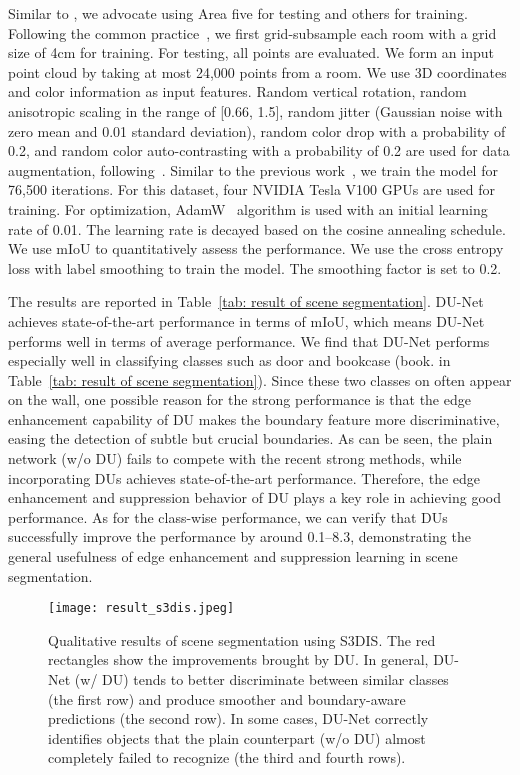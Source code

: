 \documentclass[a4paper,fleqn]{cas-dc}
\begin{document}
Similar to \cite{tchapmi2017segcloud}, we advocate using Area five for testing and others for training. Following the common practice~\cite{thomas2019kpconv,zhao2021point,lan2019modeling}, we first grid-subsample each room with a grid size of 4cm for training. For testing, all points are evaluated. We form an input point cloud by taking at most 24,000 points from a room. We use 3D coordinates and color information as input features. Random vertical rotation, random anisotropic scaling in the range of [0.66, 1.5], random jitter (Gaussian noise with zero mean and 0.01 standard deviation), random color drop with a probability of 0.2, and random color auto-contrasting with a probability of 0.2 are used for data augmentation, following~\cite{zhao2021point,lai2022stratified}. Similar to the previous work~\cite{zhao2021point}, we train the model for 76,500 iterations. For this dataset, four NVIDIA Tesla V100 GPUs are used for training. For optimization, AdamW~\cite{loshchilov2018decoupled} algorithm is used with an initial learning rate of 0.01. The learning rate is decayed based on the cosine annealing schedule. We use mIoU to quantitatively assess the performance.
We use the cross entropy loss with label smoothing to train the model. The smoothing factor is set to 0.2.

The results are reported in Table~\ref{tab: result of scene segmentation}. DU-Net achieves state-of-the-art performance in terms of mIoU, which means DU-Net performs well in terms of average performance.  
We find that DU-Net performs especially well in classifying classes such as door and bookcase (book. in Table~\ref{tab: result of scene segmentation}). Since these two classes on often appear on the wall, one possible reason for the strong performance is that the edge enhancement capability of DU makes the boundary feature more discriminative, easing the detection of subtle but crucial boundaries.  
As can be seen, the plain network (w/o DU) fails to compete with the recent strong methods, while incorporating DUs achieves state-of-the-art performance. Therefore, the edge enhancement and suppression behavior of DU plays a key role in achieving good performance. 
As for the class-wise performance, we can verify that DUs successfully improve the performance by around 0.1--8.3, demonstrating the general usefulness of edge enhancement and suppression learning in scene segmentation.  
\begin{figure*}[t]
     \centering
    \texttt{[image: result\_s3dis.jpeg]}
    \caption{
    Qualitative results of scene segmentation using S3DIS. The red rectangles show the improvements brought by DU. In general, DU-Net (w/ DU) tends to better discriminate between similar classes (the first row) and produce smoother and boundary-aware predictions (the second row). In some cases, DU-Net correctly identifies objects that the plain counterpart (w/o DU) almost completely failed to recognize (the third and fourth rows).  
    }
    \label{fig: qualitative result of s3dis}
\end{figure*}
\end{document}
